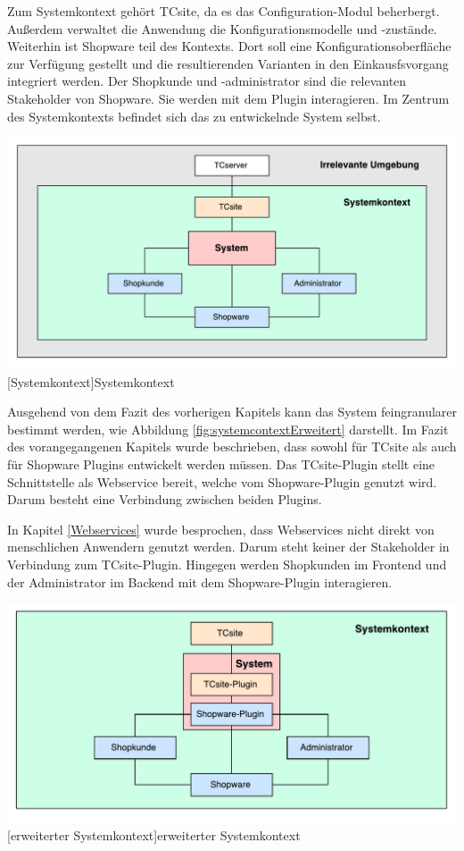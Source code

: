 \documentclass[11pt, a4paper, titlepage, listof=totoc, bibliography=totoc, index=totoc, twoside, openright, headings=normal]{scrreprt}
\begin{document}
Zum Systemkontext gehört TCsite, da es das Configuration-Modul beherbergt. Außerdem verwaltet die Anwendung die Konfigurationsmodelle und -zustände. Weiterhin ist Shopware teil des Kontexts. Dort soll eine Konfigurationsoberfläche zur Verfügung gestellt und die resultierenden Varianten in den Einkausfsvorgang integriert werden. Der Shopkunde und -administrator sind die relevanten Stakeholder von Shopware. Sie werden mit dem Plugin interagieren.
Im Zentrum des Systemkontexts befindet sich das zu entwickelnde System selbst.

\vspace{1em}
\begin{minipage}{\linewidth}
	\centering
	\includegraphics[width=0.8\linewidth]{Abbildungen/systemcontext.pdf}
	[Systemkontext]{Systemkontext}
	\label{fig:systemcontext}
\end{minipage}
\vspace{0.3em}

Ausgehend von dem Fazit des vorherigen Kapitels kann das System feingranularer bestimmt werden, wie Abbildung \ref{fig:systemcontextErweitert} darstellt. Im Fazit des vorangegangenen Kapitels wurde beschrieben, dass sowohl für TCsite als auch für Shopware Plugins entwickelt werden müssen. Das TCsite-Plugin stellt eine Schnittstelle als Webservice bereit, welche vom Shopware-Plugin genutzt wird. Darum besteht eine Verbindung zwischen beiden Plugins.

In Kapitel \ref{Webservices} wurde besprochen, dass Webservices nicht direkt von menschlichen Anwendern genutzt werden. Darum steht keiner der Stakeholder in Verbindung zum TCsite-Plugin. Hingegen werden Shopkunden im Frontend und der Administrator im Backend mit dem Shopware-Plugin interagieren.

\vspace{1em}
\begin{minipage}{\linewidth}
	\centering
	\includegraphics[width=0.8\linewidth]{Abbildungen/systemcontextErweitert.pdf}
	[erweiterter Systemkontext]{erweiterter Systemkontext}
	\label{fig:systemcontextErweitert}
\end{minipage}
\vspace{0.3em}
\end{document}
